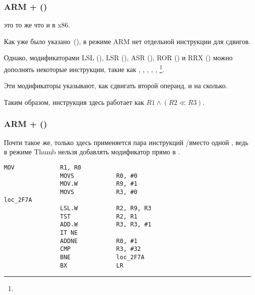 \subsubsection{ARM + \OptimizingXcodeIV (\ARMMode)}



\TST это то же что и \TEST в x86.

Как уже было указано~(),
в режиме ARM нет отдельной инструкции для сдвигов.

Однако, модификаторами 
LSL (), 
LSR (), 
ASR (), 
ROR () и
RRX () можно дополнять некоторые инструкции, такие как \MOV, \TST,
\CMP, \ADD, \SUB, \RSB\footnote{\DataProcessingInstructionsFootNote}.

Эти модификаторы указывают, как сдвигать второй операнд, и на сколько.

Таким образом, инструкция   здесь работает как $R1 \land (R2 \ll R3)$.

\subsubsection{ARM + \OptimizingXcodeIV (\ThumbTwoMode)}

Почти такое же, только здесь применяется пара инструкций /\TST вместо одной \TST,
ведь в режиме Thumb нельзя добавлять модификатор \LSL прямо в \TST.

\begin{lstlisting}[label=ARM_leaf_example5,style=customasmARM]
                MOV             R1, R0
                MOVS            R0, #0
                MOV.W           R9, #1
                MOVS            R3, #0
loc_2F7A
                LSL.W           R2, R9, R3
                TST             R2, R1
                ADD.W           R3, R3, #1
                IT NE
                ADDNE           R0, #1
                CMP             R3, #32
                BNE             loc_2F7A
                BX              LR
\end{lstlisting}

